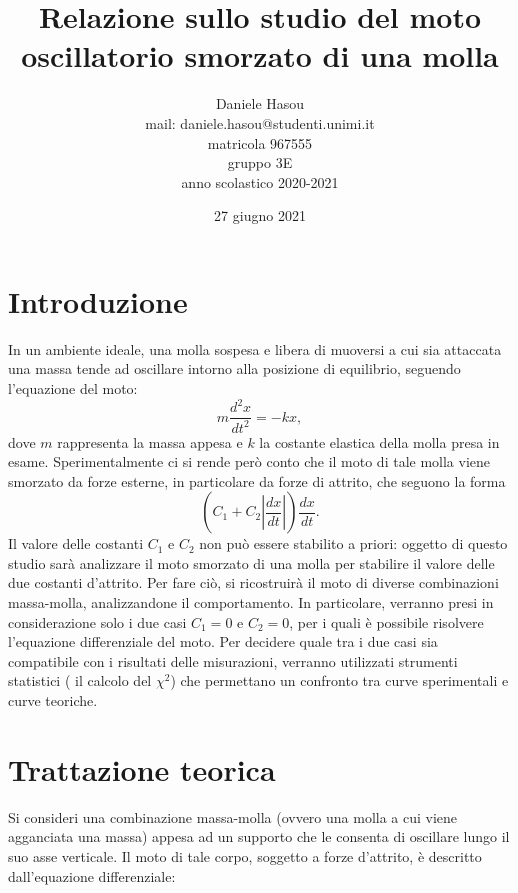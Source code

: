 \documentclass{article}
\begin{document}
\title{Relazione sullo studio del moto oscillatorio smorzato di una molla}
\author{Daniele Hasou \\ mail: daniele.hasou@studenti.unimi.it \\ matricola 967555 \\ gruppo 3E \\ anno scolastico 2020-2021 }
\date{27 giugno 2021}
\maketitle

\newpage

\section{Introduzione}
In un ambiente ideale, una molla sospesa e libera di muoversi a cui sia attaccata una massa tende ad oscillare intorno alla posizione di equilibrio, seguendo l'equazione del moto:
\begin{equation}
    m\frac{d^2x}{dt^2}=-kx,
\end{equation}
dove $m$ rappresenta la massa appesa e $k$ la costante elastica della molla presa in esame. Sperimentalmente ci si rende però conto che il moto di tale molla viene smorzato da forze esterne, in particolare da forze di attrito, che seguono la forma
\begin{equation}
    (C_1+C_2|{\frac{dx}{dt}}|)\frac{dx}{dt}.
\end{equation}
Il valore delle costanti $C_1$ e $C_2$ non può essere stabilito a priori: oggetto di questo studio sarà analizzare il moto smorzato di una molla per stabilire il valore delle due costanti d'attrito. Per fare ciò, si ricostruirà il moto di diverse combinazioni massa-molla, analizzandone il comportamento. In particolare, verranno presi in considerazione solo i due casi $C_1=0$ e $C_2=0$, per i quali è possibile risolvere l'equazione differenziale del moto.
Per decidere quale tra i due casi sia compatibile con i risultati delle misurazioni, verranno utilizzati strumenti statistici ( il calcolo del $\chi^2$) che permettano un confronto tra curve sperimentali e curve teoriche.

\section{Trattazione teorica}
Si consideri una combinazione massa-molla (ovvero una molla a cui viene agganciata una massa) appesa ad un supporto che le consenta di oscillare lungo il suo asse verticale. Il moto di tale corpo, soggetto a forze d'attrito, è descritto dall'equazione differenziale:
\end{document}
